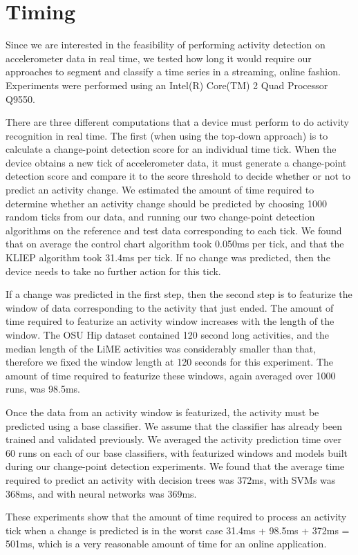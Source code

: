 \section{Timing}

Since we are interested in the feasibility of performing activity detection on
accelerometer data in real time, we tested how long it would require our
approaches to segment and classify a time series in a streaming, online fashion.
Experiments were performed using an Intel(R) Core(TM) 2 Quad Processor Q9550.

There are three different computations that a device must perform to do
activity recognition in real time. The first (when using the top-down approach)
is to calculate a change-point
detection score for an individual time tick. When the device obtains a new tick of
accelerometer data, it must generate a change-point detection score and compare
it to the score threshold to decide whether or not to predict an activity
change. We estimated the amount of time required to determine whether an
activity change should be predicted by choosing 1000 random ticks from our data,
and running our two change-point detection algorithms on the reference and test
data corresponding to each tick. We found that on average the control chart algorithm
took 0.050ms per tick, and that the KLIEP algorithm took 31.4ms per tick. If no change
was predicted, then the device needs to take no further action for this tick.

If a change was predicted in the first step, then the second step is to
featurize the window of data corresponding to the activity that just ended.
The amount of time required to featurize an activity window increases with the
length of the window. The OSU Hip dataset contained 120 second long activities,
and the median length of the LiME activities was considerably smaller than that,
therefore we fixed the window length at 120 seconds for this experiment. The
amount of time required to featurize these windows, again averaged over 1000 runs,
was 98.5ms.

Once the data from an activity window is featurized, the activity must be
predicted using a base classifier. We assume that the classifier has already
been trained and validated previously. We averaged the activity prediction time
over 60 runs on each of our base classifiers, with featurized windows and models
built during our change-point detection experiments. We found that the average
time required to predict an activity with decision trees was 372ms, with
SVMs was 368ms, and with neural networks was 369ms.

These experiments show that the amount of time required to process an activity
tick when a change is predicted is in the worst case
31.4ms + 98.5ms + 372ms = 501ms, which is a very reasonable amount of time
for an online application.
